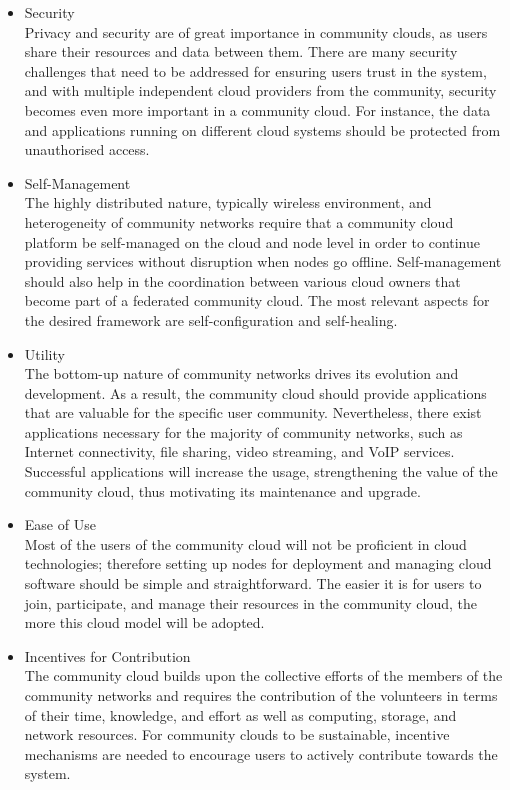 \begin{itemize}

\item Security
\\Privacy and security are of great importance in community clouds, as users share their resources and data between them. There are many security challenges that need to be addressed for ensuring users trust in the system, and with multiple independent cloud providers from the community, security becomes even more important in a community cloud. 
For instance, the data and applications running on different cloud systems should be protected from unauthorised access.

\item Self-Management
\\ The highly distributed nature, typically wireless environment, and heterogeneity of community networks require that a community cloud platform be self-managed on the cloud and node level in order to continue providing services without disruption when nodes go offline. Self-management should also help in the coordination between various cloud owners that become part of a federated community cloud. The most relevant aspects for the desired framework are self-configuration and self-healing.

\item Utility
\\The bottom-up nature of community networks drives its evolution and development. As a result, the community cloud should provide applications that are valuable for the specific user community. Nevertheless, there exist applications necessary for the majority of community networks, 
such as Internet connectivity, file sharing, video streaming, and VoIP services. Successful applications will increase the usage, strengthening the value of the community cloud, thus motivating its maintenance and upgrade.

\item Ease of Use
\\Most of the users of the community cloud will not be proficient in cloud technologies; therefore setting up nodes for deployment and managing cloud software should be simple and straightforward. The easier it is for users to join, participate, and manage their resources in the community cloud, the more this cloud model will be adopted.

\item Incentives for Contribution
\\The community cloud builds upon the collective efforts of the members of the community networks and requires the contribution of the volunteers in terms of their time, knowledge, and effort as well as computing, storage, and network resources. 
For community clouds to be sustainable, incentive mechanisms are needed to encourage users to actively contribute towards the system.


\end{itemize}
